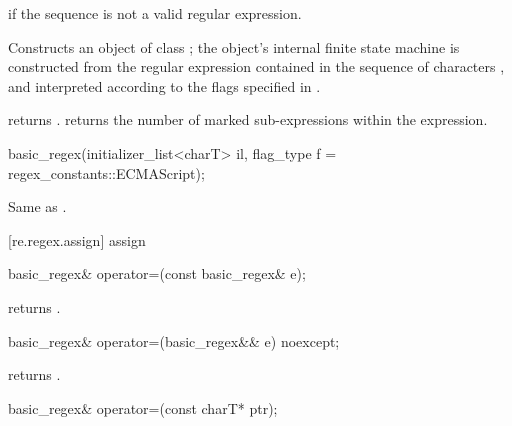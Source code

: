 \begin{itemdescr}
\pnum
\throws  {} if the sequence  is not a
valid regular expression.

\pnum
\effects  Constructs an object of class ; the object's
internal finite state machine is constructed from the regular
expression contained in the sequence of characters , and
interpreted according to the flags specified in .

\pnum\postconditions
{} returns .  
 returns the number of marked sub-expressions
within the expression.
\end{itemdescr}

%
\begin{itemdecl}
basic_regex(initializer_list<charT> il,
            flag_type f = regex_constants::ECMAScript);
\end{itemdecl}

\begin{itemdescr}
\pnum
\effects Same as .
\end{itemdescr}

[re.regex.assign]{ assign}

%
%
\begin{itemdecl}
basic_regex& operator=(const basic_regex& e); 
\end{itemdecl}

\begin{itemdescr}
\pnum
\effects  returns .
\end{itemdescr}

%
%
\begin{itemdecl}
basic_regex& operator=(basic_regex&& e) noexcept;
\end{itemdecl}

\begin{itemdescr}
\pnum
\effects  returns .
\end{itemdescr}

%
%
\begin{itemdecl}
basic_regex& operator=(const charT* ptr); 
\end{itemdecl}


